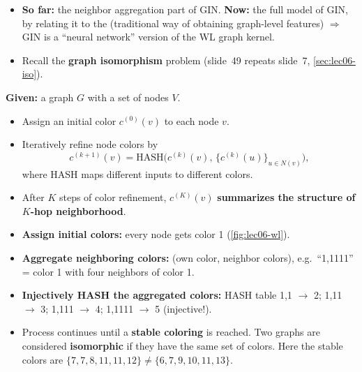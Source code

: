 \begin{itemize}
  \item \textbf{So far:} the neighbor aggregation part of GIN. \textbf{Now:} the
    full model of GIN, by relating it to the  (traditional
    way of obtaining graph-level features) $\Rightarrow$ GIN is a ``neural
    network'' version of the WL graph kernel.
  \item Recall the \textbf{graph isomorphism} problem (slide~49 repeats slide~7,
    \cref{sec:lec06-iso}).
\end{itemize}
\begin{definition}\label{def:lec06-wl}
  \textbf{Given:} a graph $G$ with a set of nodes $V$.
  \begin{itemize}
    \item Assign an initial color $c^{(0)}(v)$ to each node $v$.
    \item Iteratively refine node colors by
      \begin{equation}\label{eq:lec06-wl}
        c^{(k+1)}(v) = \mathrm{HASH}\Big(c^{(k)}(v),\, \big\{c^{(k)}(u)\big\}_{u\in N(v)}\Big),
      \end{equation}
      where HASH maps different inputs to different colors.
    \item After $K$ steps of color refinement, $c^{(K)}(v)$ \textbf{summarizes the
      structure of $K$-hop neighborhood}.
  \end{itemize}
\end{definition}
\begin{example}
  \begin{itemize}
    \item \textbf{Assign initial colors:} every node gets color 1
      (\cref{fig:lec06-wl}).
    \item \textbf{Aggregate neighboring colors:} (own color, neighbor colors),
      e.g.\ ``1,1111'' = color 1 with four neighbors of color 1.
    \item \textbf{Injectively HASH the aggregated colors:} HASH table
      1,1 $\to$ 2; 1,11 $\to$ 3; 1,111 $\to$ 4; 1,1111 $\to$ 5 (injective!).
    \item Process continues until a \textbf{stable coloring} is reached. Two graphs
      are considered \textbf{isomorphic} if they have the same set of colors. Here
      the stable colors are $\{7,7,8,11,11,12\}\neq\{6,7,9,10,11,13\}$.
  \end{itemize}
\end{example}

